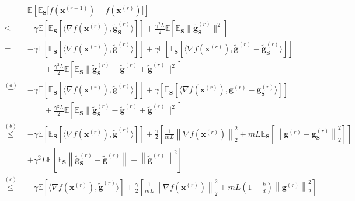 \documentclass[review,onefignum,onetabnum]{siamart190516}
\begin{document}
\begin{equation}\label{eq:Lipschitz-c-gd-alt}
\begin{split}
    &\mathbb{E}\left[\mathbb{E}_\mathbf{S}\Big[f({\boldsymbol{x}}^{(r+1)})-f({\boldsymbol{x}}^{(r)})\Big]\right]\\
    \leq& -\gamma\mathbb{E}\left[\mathbb{E}_\mathbf{S}\left[ \big\langle\nabla f({\boldsymbol{x}}^{(r)}),\tilde{\mathbf{g}}_\mathbf{S}^{(r)}\big\rangle\right]\right]+\frac{\gamma^2 L}{2}\mathbb{E}\left[\mathbb{E}_\mathbf{S}\|\tilde{\mathbf{g}}_\mathbf{S}^{(r)}\|^2\right]\\
    =&-\gamma\mathbb{E}\left[\mathbb{E}_\mathbf{S}\left[ \big\langle\nabla f({\boldsymbol{x}}^{(r)}),\tilde{\mathbf{g}}^{(r)}\big\rangle\right]\right]+\gamma\mathbb{E}\left[\mathbb{E}_\mathbf{S}\left[ \big\langle\nabla f({\boldsymbol{x}}^{(r)}),\tilde{\mathbf{g}}^{(r)}-\tilde{\mathbf{g}}_{\mathbf{S}}^{(r)}\big\rangle\right]\right]\\
    &\qquad+\frac{\gamma^2 L}{2}\mathbb{E}\left[\mathbb{E}_\mathbf{S}\|\tilde{\mathbf{g}}_\mathbf{S}^{(r)}-\tilde{\mathbf{g}}^{(r)}+\tilde{\mathbf{g}}^{(r)}\|^2\right] \\
    \stackrel{(a)}{=}& -\gamma\mathbb{E}\left[\mathbb{E}_\mathbf{S}\left[ \big\langle\nabla f({\boldsymbol{x}}^{(r)}),\tilde{\mathbf{g}}^{(r)}\big\rangle\right]\right]+\gamma\left[\mathbb{E}_\mathbf{S}\left[ \big\langle\nabla f({\boldsymbol{x}}^{(r)}),{\mathbf{g}}^{(r)}-{\mathbf{g}}_{\mathbf{S}}^{(r)}\big\rangle\right]\right]\nonumber\\
    &\qquad+\frac{\gamma^2 L}{2}\mathbb{E}\left[\mathbb{E}_\mathbf{S}\|\tilde{\mathbf{g}}_\mathbf{S}^{(r)}-\tilde{\mathbf{g}}^{(r)}+\tilde{\mathbf{g}}^{(r)}\|^2\right]\\
    \stackrel{(b)}{\leq}& -\gamma\mathbb{E}\left[\mathbb{E}_\mathbf{S}\left[ \big\langle\nabla f({\boldsymbol{x}}^{(r)}),\tilde{\mathbf{g}}^{(r)}\big\rangle\right]\right]+\frac{\gamma}{2}\left[ \frac{1}{mL}\left\|\nabla f({\boldsymbol{x}}^{(r)})\right\|^2_2+mL\mathbb{E}_\mathbf{S}\left[\left\|{\mathbf{g}}^{(r)}-{\mathbf{g}}_{\mathbf{S}}^{(r)}\right\|^2_2\right]\right]\\
\qquad&+{\gamma^2 L}\mathbb{E}\left[\mathbb{E}_\mathbf{S}\left\|\tilde{\mathbf{g}}_\mathbf{S}^{(r)}-\tilde{\mathbf{g}}^{(r)}\right\|+\left\|\tilde{\mathbf{g}}^{(r)}\right\|^2\right] \\
    \stackrel{(c)}{\leq}& -\gamma\mathbb{E}\left[ \big\langle\nabla f({\boldsymbol{x}}^{(r)}),\tilde{\mathbf{g}}^{(r)}\big\rangle\right]+\frac{\gamma}{2}\left[ \frac{1}{mL}\left\|\nabla f({\boldsymbol{x}}^{(r)})\right\|^2_2+mL\left(1-\frac{k}{d}\right)\left\|{\mathbf{g}}^{(r)}\right\|^2_2\right]\nonumber\\

\end{split}
\end{equation}
\end{document}
